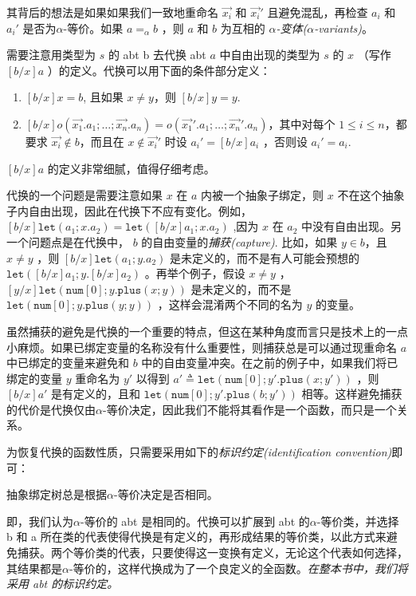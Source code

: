 其背后的想法是如果如果我们一致地重命名 \(\vec{x_i}\) 和 \(\vec{x_i}'\)
且避免混乱，再检查 \(a_i\) 和 \(a_i'\) 是否为$\alpha$-等价。如果
\(a=_\alpha b\) ，则 \(a\) 和 \(b\) 为互相的 \emph{$\alpha$-变体($\alpha$-variants)}。

需要注意用类型为 \(s\) 的 abt b 去代换 abt \(a\) 中自由出现的类型为
\(s\) 的 \(x\) （写作 \([b/x]a\)
）的定义。代换可以用下面的条件部分定义：

\begin{enumerate}
\def\labelenumi{\arabic{enumi}.}
\item
  \([b/x]x=b\), 且如果 \(x\neq y\)，则 \([b/x]y=y\).
\item
  \([b/x]o(\vec{x_1}.a_1;\dots;\vec{x_n}.a_n)=o(\vec{x_1}'.a_1;\dots;\vec{x_n}'.a_n)\)，其中对每个
  \(1\leq i\leq n\)，都要求 \(\vec{x_i}\notin b\)，而且在
  \(x\notin \vec{x_i}'\) 时设 \(a_i'=[b/x]a_i\) ，否则设 \(a_i'=a_i\).
\end{enumerate}

\([b/x]a\) 的定义非常细腻，值得仔细考虑。

代换的一个问题是需要注意如果 \(x\) 在 \(a\) 内被一个抽象子绑定，则 \(x\)
不在这个抽象子内自由出现，因此在代换下不应有变化。例如，
\([b/x]\texttt{let}(a_1;x.a_2)=\texttt{let}([b/x]a_1;x.a_2)\) ,因为
\(x\) 在 \(a_2\) 中没有自由出现。另一个问题点是在代换中， \(b\)
的自由变量的\emph{捕获(capture)}. 比如，如果 \(y\in b\)，且 \(x\neq y\)
，则 \([b/x]\texttt{let}(a_1;y.a_2)\) 是未定义的，而不是有人可能会预想的
\(\texttt{let}([b/x]a_1;y.[b/x]a_2)\) 。再举个例子，假设 \(x\neq y\) ，
\([y/x]\texttt{let}(\texttt{num}[0];y.\texttt{plus}(x;y))\)
是未定义的，而不是
\(\texttt{let}(\texttt{num}[0];y.\texttt{plus}(y;y))\)
，这样会混淆两个不同的名为 \(y\) 的变量。

虽然捕获的避免是代换的一个重要的特点，但这在某种角度而言只是技术上的一点小麻烦。如果已绑定变量的名称没有什么重要性，则捕获总是可以通过现重命名
\(a\) 中已绑定的变量来避免和 \(b\)
中的自由变量冲突。在之前的例子中，如果我们将已绑定的变量 \(y\) 重命名为
\(y'\) 以得到
\(a' \triangleq \texttt{let}(\texttt{num}[0];y'.\texttt{plus}(x;y'))\)
，则 \([b/x]a'\) 是有定义的，且和
\(\texttt{let}(\texttt{num}[0];y'.\texttt{plus}(b;y'))\)
相等。这样避免捕获的代价是代换仅由$\alpha$-等价决定，因此我们不能将其看作是一个函数，而只是一个关系。

为恢复代换的函数性质，只需要采用如下的\emph{标识约定(identification
convention)}即可：

  抽象绑定树总是根据$\alpha$-等价决定是否相同。

即，我们认为$\alpha$-等价的 abt 是相同的。代换可以扩展到 abt 的$\alpha$-等价类，并选择
b 和 a
所在类的代表使得代换是有定义的，再形成结果的等价类，以此方式来避免捕获。两个等价类的代表，只要使得这一变换有定义，无论这个代表如何选择，其结果都是$\alpha$-等价的，这样代换成为了一个良定义的全函数。\emph{在整本书中，我们将采用
abt 的标识约定。}

